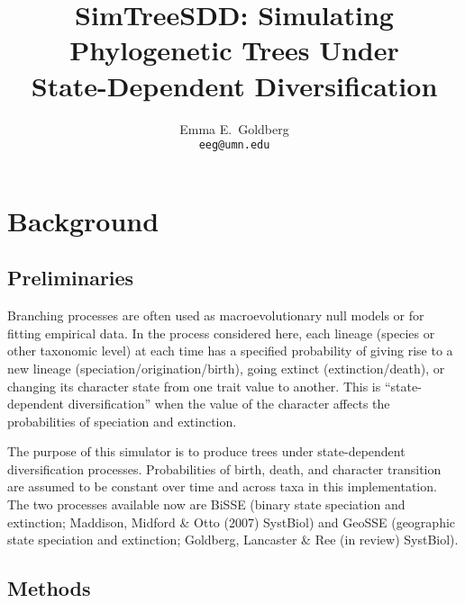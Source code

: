 \documentclass[10pt]{article}
\begin{document}
\title{ \Large{ {\bf SimTreeSDD}: {\bf Sim}ulating Phylogenetic {\bf Tree}s Under \\ {\bf S}tate-{\bf D}ependent {\bf D}iversification } }
\author{ \large{Emma E.\ Goldberg} \\ \normalsize{\texttt{eeg@umn.edu}} }
\maketitle

\tableofcontents

\section*{Background}

\subsection*{Preliminaries}

Branching processes are often used as macroevolutionary null models or for fitting empirical data.
In the process considered here, each lineage (species or other taxonomic level) at each time has a specified probability of giving rise to a new lineage (speciation/origination/birth), going extinct (extinction/death), or changing its character state from one trait value to another.
This is ``state-dependent diversification'' when the value of the character affects the probabilities of speciation and extinction.

The purpose of this simulator is to produce trees under state-dependent diversification processes.
Probabilities of birth, death, and character transition are assumed to be constant over time and across taxa in this implementation.
The two processes available now are BiSSE (binary state speciation and extinction; Maddison, Midford \& Otto (2007) SystBiol) and GeoSSE (geographic state speciation and extinction; Goldberg, Lancaster \& Ree (in review) SystBiol).

\subsection*{Methods}
\end{document}
